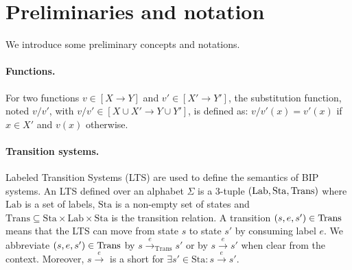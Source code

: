 %
\section{Preliminaries and notation}
\label{sec:prelim}
%

We introduce some preliminary concepts and notations.
%
\paragraph{Functions.} For two functions $v\in [ X \rightarrow Y]$ and $v'\in [X' \rightarrow Y']$, the substitution function, noted $v/v'$, with $v/v' \in [X \cup X' \rightarrow Y \cup Y']$, is defined as: $v/v'(x) = v'(x)$ if $x \in X'$ and $v(x)$ otherwise.
%



\paragraph{Transition systems.}
%
Labeled Transition Systems (LTS) are used to define the semantics of BIP systems.
An LTS defined over an alphabet $\Sigma$ is a 3-tuple $(\mathrm{Lab},\mathrm{Sta},\mathrm{Trans})$ where $\mathrm{Lab}$ is a set of labels, $\mathrm{Sta}$ is a non-empty set of states and $\mathrm{Trans}\subseteq \mathrm{Sta}\times \mathrm{Lab} \times \mathrm{Sta}$ is the transition relation.
A transition $(s,e,s')\in\mathrm{Trans}$ means that the LTS can move from state $s$ to state $s'$ by consuming label $e$.
We abbreviate $(s,e,s')\in\mathrm{Trans}$ by $s \stackrel{e}{\rightarrow}_\mathrm{Trans} s'$ or by $s\stackrel{e}{\rightarrow} s'$ when clear from the context.
Moreover, $s \stackrel{e}{\rightarrow}$ is a short for $\exists s'\in\mathrm{Sta}: s\stackrel{e}{\rightarrow} s'$.
%
%
%
%


